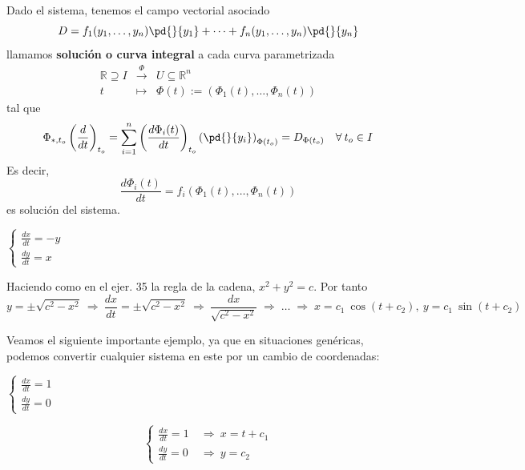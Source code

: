 \begin{defi}
    Dado el sistema, tenemos el campo vectorial asociado
    $$D=f_1(y_1, \ldots, y_n) \pd{}{y_1}+\cdots + f_n(y_1, \ldots, y_n)  \pd{}{y_n}$$
    llamamos \textbf{solución o curva integral} a cada curva parametrizada
    $$\begin{array}{rcl}
         \mathbb R \supseteq I & \overset{\Phi}{\longrightarrow} & U \subseteq \mathbb R^n  \\
         t & \longmapsto & \Phi(t):=(\Phi_1(t), \ldots, \Phi_n(t)) 
    \end{array}$$
    tal que 
    $$\Phi_{*,t_o}\left(\dfrac{d}{dt}\right)_{t_o}=\sum_{i=1}^n \left(\dfrac{d\Phi_i(t)}{dt} \right)_{t_o} \left(\pd{}{y_i} \right)_{\Phi(t_o)}=D_{\Phi(t_o)} \quad \forall \:  t_o \in I$$
    Es decir, $$\dfrac{d\Phi_i(t)}{dt}=f_i(\Phi_1(t), \ldots, \Phi_n(t))$$ es solución del sistema.
\end{defi}
\begin{ejer} \: 
    $\left\{ \begin{array}{l}
         \frac{dx}{dt}=-y  \\
         \frac{dy}{dt}=x
    \end{array}\right.$
\end{ejer}
\begin{sol}
    Haciendo como en el ejer. 35 la regla de la cadena, $x^2+y^2=c$. Por tanto
    $$y=\pm \sqrt{c^2-x^2} \: \Rightarrow \: \dfrac{dx}{dt}=\pm \sqrt{c^2-x^2} \: \Rightarrow \: \dfrac{dx}{\sqrt{c^2-x^2}} \; \Rightarrow \; \ldots \; \Rightarrow \; x=c_1 \:  \cos (t+c_2) , \: y=c_1 \: \sin (t+c_2) $$
\end{sol}
Veamos el siguiente importante ejemplo, ya que en situaciones genéricas, podemos convertir cualquier sistema en este por un cambio de coordenadas:
\begin{ejer} \: 
    $\left\{ \begin{array}{l}
         \frac{dx}{dt}=1  \\
         \frac{dy}{dt}=0
    \end{array}\right.$
\end{ejer}
\begin{sol}
    $$\left\{ \begin{array}{ll}
         \frac{dx}{dt}=1 \:& \Rightarrow \: x=t+c_1 \\
         \frac{dy}{dt}=0 \: &\Rightarrow \: y=c_2
    \end{array}\right.$$
\end{sol}
